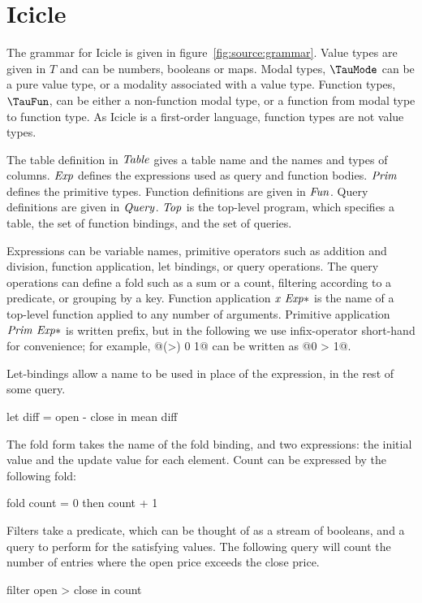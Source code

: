 \section{Icicle}
\label{s:IcicleSource}





The grammar for Icicle is given in figure~\ref{fig:source:grammar}.
Value types are given in $T$ and can be numbers, booleans or maps.
Modal types, $\TauMode$ can be a pure value type, or a modality associated with a value type.
Function types, $\TauFun$, can be either a non-function modal type, or a function from modal type to function type.
As Icicle is a first-order language, function types are not value types.

The table definition in $\mathit{Table}$ gives a table name and the names and types of columns.
$\mathit{Exp}$ defines the expressions used as query and function bodies.
$\mathit{Prim}$ defines the primitive types.
Function definitions are given in $\mathit{Fun}$.
Query definitions are given in $\mathit{Query}$.
$\mathit{Top}$ is the top-level program, which specifies a table, the set of function bindings, and the set of queries.

Expressions can be variable names, primitive operators such as addition and division, function application, let bindings, or query operations.
The query operations can define a fold such as a sum or a count, filtering according to a predicate, or grouping by a key.
Function application $\mathit{x~Exp*}$ is the name of a top-level function applied to any number of arguments.
Primitive application $\mathit{Prim~Exp*}$ is written prefix, but in the following we use infix-operator short-hand for convenience; for example, @(>) 0 1@ can be written as @0 > 1@.

Let-bindings allow a name to be used in place of the expression, in the rest of some query.
\begin{code}
let diff = open - close
in  mean diff
\end{code}

The fold form takes the name of the fold binding, and two expressions: the initial value and the update value for each element.
Count can be expressed by the following fold:
\begin{code}
fold count = 0 then count + 1
\end{code}

Filters take a predicate, which can be thought of as a stream of booleans, and a query to perform for the satisfying values.
The following query will count the number of entries where the open price exceeds the close price.
\begin{code}
filter open > close in count
\end{code}

